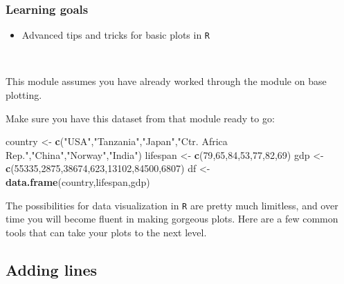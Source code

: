 \documentclass[]{book}
\newenvironment{Shaded}{\begin{snugshade}}{\end{snugshade}}
\newcommand{\DecValTok}[1]{\textcolor[rgb]{0.00,0.00,0.81}{#1}}
\newcommand{\KeywordTok}[1]{\textcolor[rgb]{0.13,0.29,0.53}{\textbf{#1}}}
\newcommand{\NormalTok}[1]{#1}
\newcommand{\StringTok}[1]{\textcolor[rgb]{0.31,0.60,0.02}{#1}}
\providecommand{\tightlist}{%
  \setlength{\itemsep}{0pt}\setlength{\parskip}{0pt}}
\begin{document}
\hypertarget{learning-goals-35}{%
\subsubsection*{Learning goals}\label{learning-goals-35}}

\begin{itemize}
\tightlist
\item
  Advanced tips and tricks for basic plots in \texttt{R}
\end{itemize}

~

This module assumes you have already worked through the module on base plotting.

Make sure you have this dataset from that module ready to go:

\begin{Shaded}
\begin{Highlighting}[]
\NormalTok{country <-}\StringTok{ }\KeywordTok{c}\NormalTok{(}\StringTok{"USA"}\NormalTok{,}\StringTok{"Tanzania"}\NormalTok{,}\StringTok{"Japan"}\NormalTok{,}\StringTok{"Ctr. Africa Rep."}\NormalTok{,}\StringTok{"China"}\NormalTok{,}\StringTok{"Norway"}\NormalTok{,}\StringTok{"India"}\NormalTok{)}
\NormalTok{lifespan <-}\StringTok{ }\KeywordTok{c}\NormalTok{(}\DecValTok{79}\NormalTok{,}\DecValTok{65}\NormalTok{,}\DecValTok{84}\NormalTok{,}\DecValTok{53}\NormalTok{,}\DecValTok{77}\NormalTok{,}\DecValTok{82}\NormalTok{,}\DecValTok{69}\NormalTok{)}
\NormalTok{gdp <-}\StringTok{ }\KeywordTok{c}\NormalTok{(}\DecValTok{55335}\NormalTok{,}\DecValTok{2875}\NormalTok{,}\DecValTok{38674}\NormalTok{,}\DecValTok{623}\NormalTok{,}\DecValTok{13102}\NormalTok{,}\DecValTok{84500}\NormalTok{,}\DecValTok{6807}\NormalTok{)}
\NormalTok{df <-}\StringTok{ }\KeywordTok{data.frame}\NormalTok{(country,lifespan,gdp)}
\end{Highlighting}
\end{Shaded}

The possibilities for data visualization in \texttt{R} are pretty much limitless, and over time you will become fluent in making gorgeous plots. Here are a few common tools that can take your plots to the next level.

\hypertarget{adding-lines}{%
\subsection*{Adding lines}\label{adding-lines}}
\end{document}
